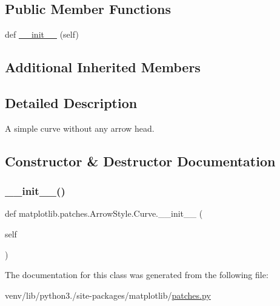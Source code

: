 \subsection*{Public Member Functions}
\begin{DoxyCompactItemize}
\item 
def \hyperlink{classmatplotlib_1_1patches_1_1ArrowStyle_1_1Curve_a6632ef6c22aa652f3e2de32703d47edb}{\+\_\+\+\_\+init\+\_\+\+\_\+} (self)
\end{DoxyCompactItemize}
\subsection*{Additional Inherited Members}


\subsection{Detailed Description}
\begin{DoxyVerb}A simple curve without any arrow head.\end{DoxyVerb}
 

\subsection{Constructor \& Destructor Documentation}
\mbox{\label{classmatplotlib_1_1patches_1_1ArrowStyle_1_1Curve_a6632ef6c22aa652f3e2de32703d47edb}} 
\subsubsection{\texorpdfstring{\+\_\+\+\_\+init\+\_\+\+\_\+()}{\_\_init\_\_()}}
{\footnotesize\ttfamily def matplotlib.\+patches.\+Arrow\+Style.\+Curve.\+\_\+\+\_\+init\+\_\+\+\_\+ (\begin{DoxyParamCaption}\item[{}]{self }\end{DoxyParamCaption})}



The documentation for this class was generated from the following file\+:\begin{DoxyCompactItemize}
\item 
venv/lib/python3./site-\/packages/matplotlib/\hyperlink{patches_8py}{patches.\+py}\end{DoxyCompactItemize}
